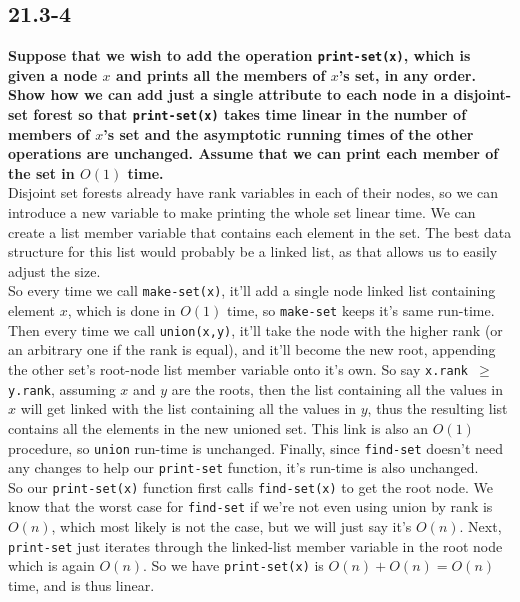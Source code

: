 \documentclass[11pt]{article}
\begin{document}
 \newpage

 \subsection*{21.3-4}
 \textbf{Suppose that we wish to add the operation \texttt{print-set(x)}, which is given a node 
 $x$ and prints all the members of $x$’s set, in any order. Show how we can add just a single 
 attribute to each node in a disjoint-set forest so that \texttt{print-set(x)} takes time 
 linear in the number of members of $x$’s set and the asymptotic running times of the other 
 operations are unchanged. Assume that we can print each member of the set in $O(1)$ time.} \\

 Disjoint set forests already have rank variables in each of their nodes, so we can introduce 
 a new variable to make printing the whole set linear time.  We can create a list member 
 variable that contains each element in the set.  The best data structure for this list would 
 probably be a linked list, as that allows us to easily adjust the size. \\

 So every time we call \texttt{make-set(x)}, it'll add a single node linked list containing 
 element $x$, which is done in $O(1)$ time, so \texttt{make-set} keeps it's same run-time.  
 Then every time we call \texttt{union(x,y)}, it'll take the node with the 
 higher rank (or an arbitrary one if the rank is equal), and it'll become the new root, 
 appending the other set's root-node list member variable onto it's own.  So say 
 \texttt{x.rank $\geq$ y.rank}, assuming $x$ and $y$ are the roots, then the list containing 
 all the values in $x$ will get linked with the list containing all the values in $y$, thus 
 the resulting list contains all the elements in the new unioned set. This link is also an 
 $O(1)$ procedure, so \texttt{union} run-time is unchanged. Finally, since \texttt{find-set} 
 doesn't need any changes to help our \texttt{print-set} function, it's run-time is also 
 unchanged. \\

 So our \texttt{print-set(x)} function first calls \texttt{find-set(x)} to get the root node.  
 We know that the worst case for \texttt{find-set} if we're not even using union by rank is 
 $O(n)$, which most likely is not the case, but we will just say it's $O(n)$.  Next, 
 \texttt{print-set} just iterates through the linked-list member variable in the root node which 
 is again $O(n)$.  So we have \texttt{print-set(x)} is $O(n) + O(n) = O(n)$ time, and is thus 
 linear.
 \newpage
\end{document}
